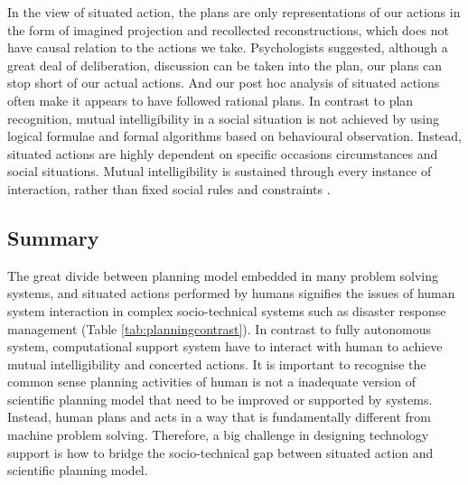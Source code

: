 In the view of situated action, the plans are only representations of our actions in the form of imagined projection and recollected reconstructions, which does not have causal relation to the actions we take. Psychologists \cite{Mead1934} suggested, although a great deal of deliberation, discussion can be taken into the plan, our plans can stop short of our actual actions. And our post hoc analysis of situated actions often make it appears to have followed rational plans. In contrast to plan recognition, mutual intelligibility in a social situation is not achieved by using logical formulae and formal algorithms based on behavioural observation. Instead, situated actions are highly dependent on specific occasions circumstances and social situations. Mutual intelligibility is sustained through every instance of interaction, rather than fixed social rules and constraints \cite{Suchman1987}.\\


\subsection{Summary}
The great divide between planning model embedded in many problem solving systems, and situated actions performed by humans signifies the issues of human system interaction in complex socio-technical systems such as disaster response management (Table \ref{tab:planningcontrast}). In contrast to fully autonomous system, computational support system have to interact with human to achieve mutual intelligibility and concerted actions. It is important to recognise the common sense planning activities of human is not a inadequate version of scientific planning model that need to be improved or supported by systems. Instead, human plans and acts in a way that is fundamentally different from machine problem solving. Therefore, a big challenge in designing technology support is how to bridge the socio-technical gap between situated action and scientific planning model.\\

